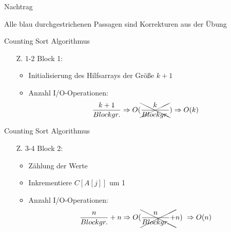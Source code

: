\documentclass[handout]{beamer}
\def \korrekturfarbe {blue}
\begin{document}
\begin{frame}{Nachtrag}
  \begin{center}
    Alle {\color{\korrekturfarbe}blau} durchgestrichenen Passagen sind Korrekturen aus der Übung
  \end{center}
\end{frame}

\begin{frame}{Counting Sort Algorithmus}

  \begin{itemize}
    \item[Z. 1-2] Block 1:
    \begin{itemize}
      \item Initialisierung des Hilfsarrays der Größe $k+1$
      \item Anzahl I/O-Operationen:
            \[
              \frac{k+1}{Blockgr.} \Rightarrow O(\xcancel{\frac{k}{Blockgr.}}) \Rightarrow O(k)
            \]
    \end{itemize}
  \end{itemize}
  \vspace{1cm}
  \begin{figure}
    \flushright
  \end{figure}
\end{frame}

\begin{frame}{Counting Sort Algorithmus}
  \begin{itemize}
    \item[Z. 3-4] Block 2:
    \begin{itemize}
      \item Zählung der Werte
      \item Inkrementiere $C[A[j]]$ um 1
      \item Anzahl I/O-Operationen:
            \[
              \frac{n}{Blockgr.} + n \Rightarrow O(\xcancel{\frac{n}{Blockgr.} +} n) ~
              \Rightarrow O(n)
            \]
    \end{itemize}
  \end{itemize}
  \vspace{1cm}
  \begin{figure}
    \flushright
  \end{figure}
\end{frame}
\end{document}
